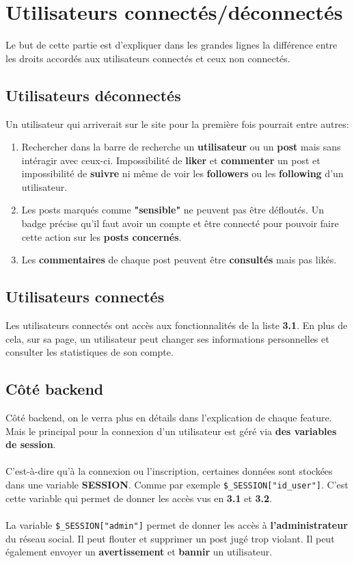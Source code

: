 \documentclass{article}
\begin{document}
\section{Utilisateurs connectés/déconnectés}
Le but de cette partie est d'expliquer dans les grandes lignes la différence entre les droits accordés aux utilisateurs connectés et ceux non connectés.
\subsection{Utilisateurs déconnectés}
Un utilisateur qui arriverait sur le site pour la première fois pourrait entre autres:
\begin{enumerate}
\item Rechercher dans la barre de recherche un \textbf{utilisateur} ou un \textbf{post} mais sans intéragir avec ceux-ci. Impossibilité de \textbf{liker} et \textbf{commenter} un post et impossibilité de \textbf{suivre} ni même de voir les \textbf{followers} ou les \textbf{following} d'un utilisateur.
\item Les posts marqués comme \textbf{"sensible"} ne peuvent pas être défloutés. Un badge précise qu'il faut avoir un compte et être connecté pour pouvoir faire cette action sur les \textbf{posts concernés}.
\item Les \textbf{commentaires} de chaque post peuvent être \textbf{consultés} mais pas likés.
\end{enumerate}
\subsection{Utilisateurs connectés}
Les utilisateurs connectés ont accès aux fonctionnalités de la liste \textbf{3.1}. En plus de cela, sur sa page, un utilisateur peut changer  ses informations personnelles et consulter les statistiques de son compte.
\subsection{Côté backend}
Côté backend, on le verra plus en détails dans l'explication de chaque feature. Mais le principal pour la connexion  d'un utilisateur est géré via \textbf{des variables de session}.\\\\ 
C'est-à-dire qu'à la connexion ou l'inscription, certaines données sont stockées dans une variable \textbf{SESSION}. Comme par exemple \texttt{\$\_SESSION["id\_user"]}. C'est cette variable qui permet de donner les accès vus en \textbf{3.1} et \textbf{3.2}.\\\\ 
La variable \texttt{\$\_SESSION["admin"]} permet de donner les accès à \textbf{l'administrateur} du réseau social. Il peut flouter et supprimer un post jugé trop violant. Il peut également envoyer un \textbf{avertissement} et \textbf{bannir} un utilisateur. 
\end{document}
